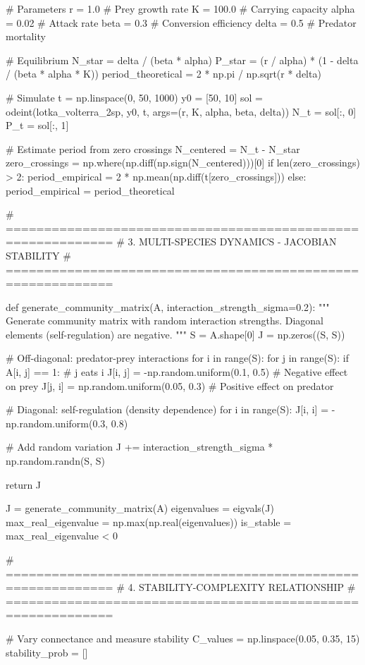 \documentclass[a4paper, 11pt]{article}
\begin{document}
\begin{pycode}
# Parameters
r = 1.0          # Prey growth rate
K = 100.0        # Carrying capacity
alpha = 0.02     # Attack rate
beta = 0.3       # Conversion efficiency
delta = 0.5      # Predator mortality

# Equilibrium
N_star = delta / (beta * alpha)
P_star = (r / alpha) * (1 - delta / (beta * alpha * K))
period_theoretical = 2 * np.pi / np.sqrt(r * delta)

# Simulate
t = np.linspace(0, 50, 1000)
y0 = [50, 10]
sol = odeint(lotka_volterra_2sp, y0, t, args=(r, K, alpha, beta, delta))
N_t = sol[:, 0]
P_t = sol[:, 1]

# Estimate period from zero crossings
N_centered = N_t - N_star
zero_crossings = np.where(np.diff(np.sign(N_centered)))[0]
if len(zero_crossings) > 2:
    period_empirical = 2 * np.mean(np.diff(t[zero_crossings]))
else:
    period_empirical = period_theoretical

# ============================================================
# 3. MULTI-SPECIES DYNAMICS - JACOBIAN STABILITY
# ============================================================

def generate_community_matrix(A, interaction_strength_sigma=0.2):
    """
    Generate community matrix with random interaction strengths.
    Diagonal elements (self-regulation) are negative.
    """
    S = A.shape[0]
    J = np.zeros((S, S))

    # Off-diagonal: predator-prey interactions
    for i in range(S):
        for j in range(S):
            if A[i, j] == 1:  # j eats i
                J[i, j] = -np.random.uniform(0.1, 0.5)  # Negative effect on prey
                J[j, i] = np.random.uniform(0.05, 0.3)  # Positive effect on predator

    # Diagonal: self-regulation (density dependence)
    for i in range(S):
        J[i, i] = -np.random.uniform(0.3, 0.8)

    # Add random variation
    J += interaction_strength_sigma * np.random.randn(S, S)

    return J

J = generate_community_matrix(A)
eigenvalues = eigvals(J)
max_real_eigenvalue = np.max(np.real(eigenvalues))
is_stable = max_real_eigenvalue < 0

# ============================================================
# 4. STABILITY-COMPLEXITY RELATIONSHIP
# ============================================================

# Vary connectance and measure stability
C_values = np.linspace(0.05, 0.35, 15)
stability_prob = []


\end{pycode}
\end{document}
